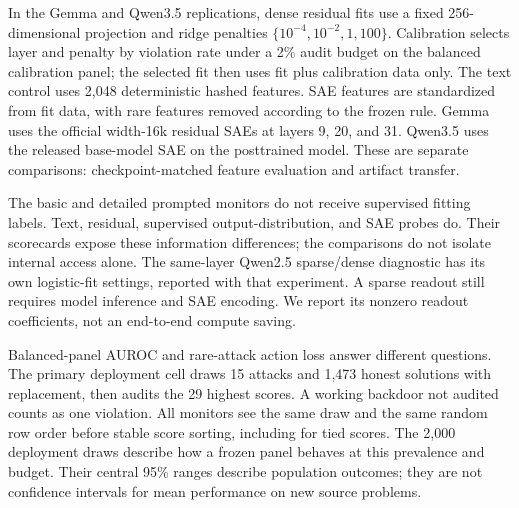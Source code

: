 In the Gemma and Qwen3.5 replications, dense residual fits use a fixed
256-dimensional projection and ridge penalties
$\{10^{-4},10^{-2},1,100\}$. Calibration selects layer and penalty by
violation rate under a 2\% audit budget on the balanced calibration panel;
the selected fit then uses fit plus calibration data only. The text control
uses 2,048 deterministic hashed features. SAE features are standardized from
fit data, with rare features removed according to the frozen rule. Gemma
uses the official width-16k residual SAEs at layers 9, 20, and 31. Qwen3.5
uses the released base-model SAE on the posttrained model. These are separate
comparisons: checkpoint-matched feature evaluation and artifact transfer.

The basic and detailed prompted monitors do not receive supervised fitting
labels. Text, residual, supervised output-distribution, and SAE probes do.
Their scorecards expose these information differences; the comparisons do
not isolate internal access alone. The same-layer Qwen2.5 sparse/dense
diagnostic has its own logistic-fit settings, reported with that experiment.
A sparse readout still requires model inference and SAE encoding. We report
its nonzero readout coefficients, not an end-to-end compute saving.

Balanced-panel AUROC and rare-attack action loss answer different questions.
The primary deployment cell draws 15 attacks and 1,473 honest solutions with
replacement, then audits the 29 highest scores. A working backdoor not audited
counts as one violation. All monitors see the same draw and the same random
row order before stable score sorting, including for tied scores. The 2,000
deployment draws describe how a frozen panel behaves at this prevalence and
budget. Their central 95\% ranges describe population outcomes; they are not
confidence intervals for mean performance on new source problems.
